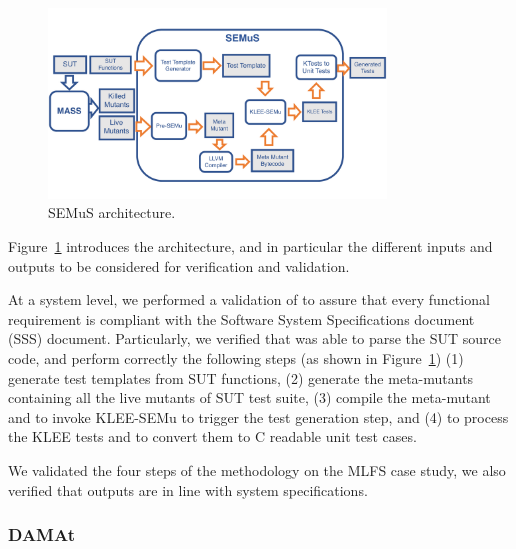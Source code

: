 \begin{figure}[t]
  \centering
  \includegraphics[width=0.8\textwidth]{images/semus-architecture.pdf}
      \caption{SEMuS architecture.}
      \label{fig:semus}
\end{figure}

Figure~\ref{fig:semus} introduces the \SEMUS architecture, and in particular the different inputs and outputs to be considered for verification and validation.

At a system level, we performed a validation of \SEMUS to assure that every functional requirement is compliant with the Software System Specifications document (SSS) document. Particularly, we verified that \SEMUS was able to parse the SUT source code, and perform correctly the following steps (as shown in Figure~\ref{fig:semus}) (1) generate test templates from SUT functions, (2) generate the meta-mutants containing all the live mutants of SUT test suite, (3) compile the meta-mutant and to invoke KLEE-SEMu to trigger the test generation step, and (4) to process the KLEE tests and to convert them to C readable unit test cases.

We validated the four steps of the methodology on the MLFS case study, we also verified that outputs are in line with system specifications.




\subsubsection{DAMAt}


